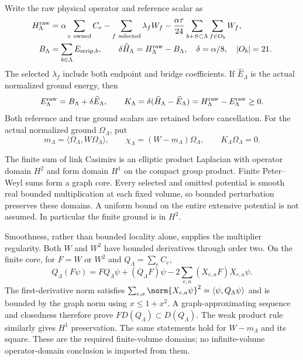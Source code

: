 Write the raw physical operator and reference scalar as
\begin{align}
 H^{\rm raw}_\Lambda
 &=\alpha\sum_{e\ {\rm owned}}C_e
 -\sum_{f\ {\rm selected}}\lambda_f W_f
 -\frac{\alpha\tau}{24}\sum_{b+S\subset\Lambda}\sum_{f\in O_b}W_f,\\
 B_\Lambda&=\sum_{b\in\Lambda}E_{{\rm strip},b},\qquad
 \delta\widehat H_\Lambda=H^{\rm raw}_\Lambda-B_\Lambda,
 \quad\delta=\alpha/8,\quad |O_b|=21.
 \label{r28:eq:ak2-raw}
\end{align}
The selected $\lambda_f$ include both endpoint and bridge coefficients. If $\widehat E_\Lambda$ is the actual normalized ground energy, then
\begin{equation}
 E^{\rm raw}_\Lambda=B_\Lambda+\delta\widehat E_\Lambda,
 \qquad K_\Lambda=\delta(\widehat H_\Lambda-\widehat E_\Lambda)
 =H^{\rm raw}_\Lambda-E^{\rm raw}_\Lambda\ge0.
 \label{r28:eq:ak2-centering}
\end{equation}
Both reference and true ground scalars are retained before cancellation. For the actual normalized ground $\Omega_\Lambda$, put
\begin{equation}
 m_\Lambda=\langle\Omega_\Lambda,W\Omega_\Lambda\rangle,
 \qquad\chi_\Lambda=(W-m_\Lambda)\Omega_\Lambda,
 \qquad K_\Lambda\Omega_\Lambda=0.
\end{equation}

The finite sum of link Casimirs is an elliptic product Laplacian with operator domain $H^2$ and form domain $H^1$ on the compact group product. Finite Peter--Weyl sums form a graph core. Every selected and omitted potential is smooth real bounded multiplication at each fixed volume, so bounded perturbation preserves these domains. A uniform bound on the entire extensive potential is not assumed. In particular the finite ground is in $H^2$.

Smoothness, rather than bounded locality alone, supplies the multiplier regularity. Both $W$ and $W^2$ have bounded derivatives through order two. On the finite core, for $F=W$ or $W^2$ and $Q_\Lambda=\sum_eC_e$,
\begin{equation}
 Q_\Lambda(F\psi)=FQ_\Lambda\psi+(Q_\Lambda F)\psi
             -2\sum_{e,a}(X_{e,a}F)X_{e,a}\psi.
 \label{r28:eq:ak2-leibniz}
\end{equation}
The first-derivative norm satisfies $\sum_{e,a}\norm{X_{e,a}\psi}^2=\langle\psi,Q_\Lambda\psi\rangle$ and is bounded by the graph norm using $x\le1+x^2$. A graph-approximating sequence and closedness therefore prove $F D(Q_\Lambda)\subset D(Q_\Lambda)$. The weak product rule similarly gives $H^1$ preservation. The same statements hold for $W-m_\Lambda$ and its square. These are the required finite-volume domains; no infinite-volume operator-domain conclusion is imported from them.

